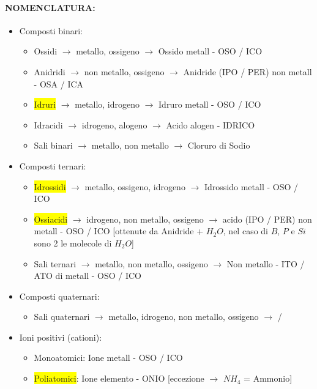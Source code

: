 \documentclass{article}
\begin{document}
\paragraph{NOMENCLATURA: } 
\begin{itemize}
	\item Composti binari: 
	\begin{itemize}
		\item Ossidi $\rightarrow$ metallo, ossigeno $\rightarrow$ Ossido metall - OSO / ICO
		\item Anidridi $\rightarrow$ non metallo, ossigeno $\rightarrow$ Anidride (IPO / PER) non metall - OSA / ICA
		\item \colorbox{yellow}{Idruri} $\rightarrow$ metallo, idrogeno $\rightarrow$ Idruro metall - OSO / ICO
		\item Idracidi $\rightarrow$ idrogeno, alogeno $\rightarrow$ Acido alogen - IDRICO
		\item Sali binari $\rightarrow$ metallo, non metallo $\rightarrow$ Cloruro di Sodio
	\end{itemize}
	\item Composti ternari: 
	\begin{itemize}
		\item \colorbox{yellow}{Idrossidi} $\rightarrow$ metallo, ossigeno, idrogeno $\rightarrow$ Idrossido metall - OSO / ICO
		\item \colorbox{yellow}{Ossiacidi} $\rightarrow$ idrogeno, non metallo, ossigeno $\rightarrow$ acido (IPO / PER) non metall - OSO / ICO [ottenute da Anidride + $H_2O$, nel caso di $B$, $P$ e $Si$ sono 2 le molecole di $H_2O$]
		\item Sali ternari $\rightarrow$ metallo, non metallo, ossigeno $\rightarrow$ Non metallo - ITO / ATO di metall - OSO / ICO 
	\end{itemize}
	\item Composti quaternari: 
	\begin{itemize}
		\item Sali quaternari $\rightarrow$ metallo, idrogeno, non metallo, ossigeno $\rightarrow$ /
	\end{itemize}
	\item Ioni positivi (cationi): 
	\begin{itemize}
		\item Monoatomici: Ione metall - OSO / ICO
		\item \colorbox{yellow}{Poliatomici}: Ione elemento - ONIO [eccezione $\rightarrow$ $NH_4$ = Ammonio]
	\end{itemize}

\end{itemize}
\end{document}

